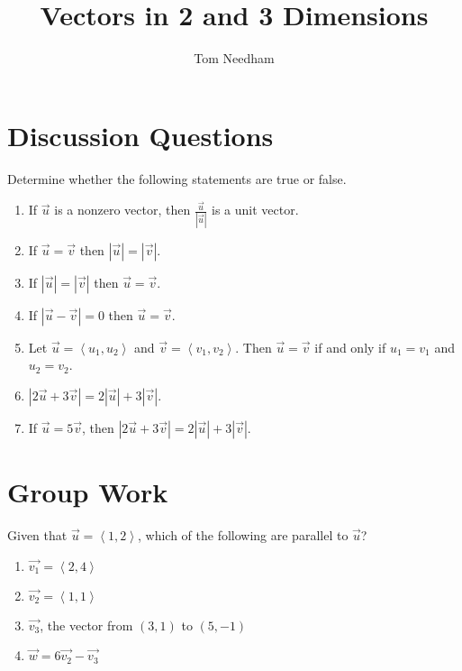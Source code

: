 \documentclass[]{ximera}
\author{Tom Needham}
\title[Collaborate:]{Vectors in 2 and 3 Dimensions}
\begin{document}
\begin{abstract}
\end{abstract}
\maketitle

\section{Discussion Questions}

\begin{problem}
Determine whether the following statements are true or false.
\begin{enumerate}[label=(\alph*)]
\item If $\vec{u}$ is a nonzero vector, then $\frac{\vec{u}}{\left|\vec{u}\right|}$ is a unit vector.
\item If $\vec{u} = \vec{v}$ then $\left|\vec{u}\right| = \left|\vec{v}\right|$.
\item If $\left|\vec{u}\right|  = \left|\vec{v}\right|$ then $\vec{u} = \vec{v}$. 
\item If $\left|\vec{u} - \vec{v}\right| = 0$ then $\vec{u} = \vec{v}$.
\item Let $\vec{u} = \left<u_1,u_2\right>$ and $\vec{v}=\left<v_1,v_2\right>$. Then $\vec{u} = \vec{v}$ if and only if $u_1 = v_1$ and $u_2 = v_2$. 
\item $\left|2\vec{u} + 3 \vec{v} \right| = 2 \left|\vec{u}\right| + 3 \left|\vec{v}\right|$. 
\item If $\vec{u} = 5 \vec{v}$, then $\left|2\vec{u} + 3 \vec{v} \right| = 2 \left|\vec{u}\right| + 3 \left|\vec{v}\right|$.
\end{enumerate}
\begin{solution}
\end{solution}
\end{problem}


\section{Group Work}

\begin{problem}
Given that $\vec{u} = \left<1,2\right>$, which of the following are parallel to $\vec{u}$?

\begin{enumerate}[label=(\alph*)]
\item $\vec{v_1}=\left<2,4\right>$
\item $\vec{v_2}=\left<1,1\right>$ 
\item $\vec{v_3}$, the vector from $(3,1)$ to $(5,-1)$
\item $\vec{w} = 6 \vec{v_2} - \vec{v_3}$
\end{enumerate}

\begin{solution}

\end{solution}
\end{problem}
\end{document}
